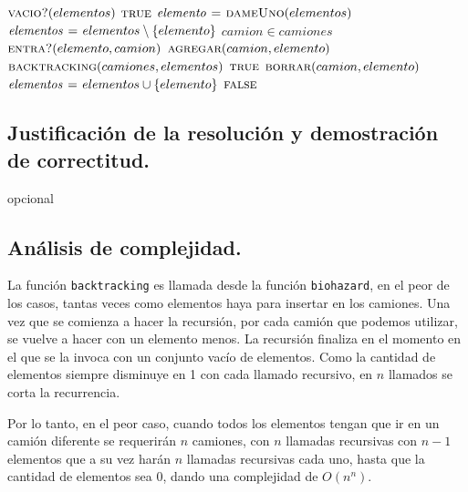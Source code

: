 \vspace*{0.5cm} 


\begin{codebox}
\li \If $\textnormal{\scshape vacio?}(elementos)$
\li     \Then
            \Return $\textnormal{\scshape true}$
        \End
\li $\id{elemento} \gets \proc{dameUno}(elementos)$
\li $\id{elementos} \gets elementos \setminus \{elemento\}$
\li \For $camion \in camiones$
\li     \Do
            \If $\textnormal{\scshape entra?}(elemento, camion)$
\li             \Then
                    $\textnormal{\scshape agregar}(camion, elemento)$
\li                 \If $\textnormal{\scshape backtracking}(camiones, elementos)$
                        \Then
\li                         \Return $\textnormal{\scshape true}$
\li                 \Else
\li                     $\textnormal{\scshape borrar}(camion, elemento)$
                    \End    
            \End
        \End
\li $\id{elementos} \gets elementos \cup \{elemento\}$
\li \Return $\textnormal{\scshape false}$
\end{codebox}



\subsection{Justificación de la resolución y demostración de correctitud.}

\vspace*{0.3cm}


opcional


\vspace*{0.75cm} \noindent



\subsection{Análisis de complejidad.}

\vspace*{0.3cm}


La función \verb|backtracking| es llamada desde la función \verb|biohazard|, en
el peor de los casos, tantas veces como elementos haya para insertar en los camiones.
Una vez que se comienza a hacer la recursión, por cada camión que podemos utilizar,
se vuelve a hacer con un elemento menos. La recursión finaliza en el momento en 
el que se la invoca con un conjunto vacío de elementos. Como la cantidad de 
elementos siempre disminuye en 1 con cada llamado recursivo, en $n$ llamados se
corta la recurrencia.

Por lo tanto, en el peor caso, cuando todos los elementos tengan que ir en un 
camión diferente se requerirán $n$ camiones, con $n$ llamadas recursivas con 
$n - 1$ elementos que a su vez harán $n$ llamadas recursivas cada uno, hasta que
la cantidad de elementos sea 0, dando una complejidad de $O(n^n)$.

